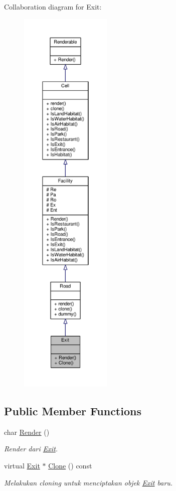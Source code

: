 Collaboration diagram for Exit\+:
\nopagebreak
\begin{figure}[H]
\begin{center}
\leavevmode
\includegraphics[height=550pt]{classExit__coll__graph}
\end{center}
\end{figure}
\subsection*{Public Member Functions}
\begin{DoxyCompactItemize}
\item 
char \hyperlink{classExit_a9239e8b13c101d1aee8fde738e8a5fdc}{Render} ()
\begin{DoxyCompactList}\small\item\em Render dari \hyperlink{classExit}{Exit}. \end{DoxyCompactList}\item 
virtual \hyperlink{classExit}{Exit} $\ast$ \hyperlink{classExit_a827f84ddccdd30e9db0ed6918560d8d4}{Clone} () const 
\begin{DoxyCompactList}\small\item\em Melakukan cloning untuk menciptakan objek \hyperlink{classExit}{Exit} baru. \end{DoxyCompactList}\end{DoxyCompactItemize}
